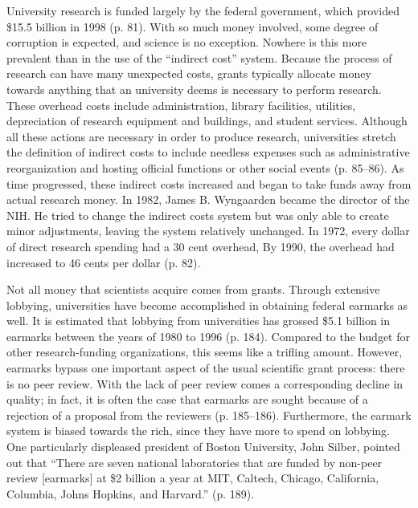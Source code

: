 \documentclass{article}[12pt]
\begin{document}
University research is funded largely by the federal government, which provided
\$15.5 billion in 1998 (p. 81). With so much money involved, some degree of
corruption is expected, and science is no exception.  Nowhere is this more
prevalent than in the use of the ``indirect cost'' system.  Because the process
of research can have many unexpected costs, grants typically allocate money
towards anything that an university deems is necessary to perform research.
These overhead costs include administration, library facilities, utilities,
depreciation of research equipment and buildings, and student services.
Although all these actions are necessary in order to produce research,
universities stretch the definition of indirect costs to include needless
expenses such as administrative reorganization and hosting official functions
or other social events (p. 85--86).  As time progressed, these indirect costs
increased and began to take funds away from actual research money.  In 1982,
James B. Wyngaarden became the director of the NIH.  He tried to change the
indirect costs system but was only able to create minor adjustments, leaving
the system relatively unchanged.  In 1972, every dollar of direct research
spending had a 30 cent overhead,  By 1990, the overhead had increased to 46
cents per dollar (p. 82).  

Not all money that scientists acquire comes from grants. Through extensive
lobbying, universities have become accomplished in obtaining federal earmarks
as well. It is estimated that lobbying from universities has grossed \$5.1
billion in earmarks between the years of 1980 to 1996 (p. 184). Compared to the
budget for other research-funding organizations, this seems like a trifling
amount. However, earmarks bypass one important aspect of the usual scientific
grant process: there is no peer review. With the lack of peer review comes a
corresponding decline in quality; in fact, it is often the case that earmarks
are sought because of a rejection of a proposal from the reviewers (p.
185--186). Furthermore, the earmark system is biased towards the rich, since
they have more to spend on lobbying. One particularly displeased president of
Boston University, John Silber, pointed out that ``There are seven national
laboratories that are funded by non-peer review [earmarks] at \$2 billion a
year at MIT, Caltech, Chicago, California, Columbia, Johns Hopkins, and
Harvard.'' (p. 189).
\end{document}
